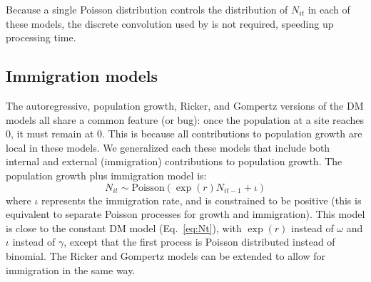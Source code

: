 \documentclass[12pt]{article}
\begin{document}
Because a single Poisson distribution controls the
distribution of $N_{it}$ in each of these models, the discrete
convolution used by \citet{dail_madsen:2011} is not required,
speeding up processing time.

\subsection{Immigration models}

The autoregressive, population growth, Ricker, and Gompertz
versions of the DM models all share a common feature (or bug):
once the population at a site reaches 0, it must remain at 0.
This is because all contributions to population growth are
local in these models.  We generalized each these models that
include both internal and external (immigration) contributions
to population growth.  The population growth plus immigration
model is:
\begin{equation}
  N_{it} \sim \text{Poisson}(\exp(r)N_{it-1} + \iota)
  \label{eq:expimm2}
\end{equation}
where $\iota$ represents the immigration rate, and is constrained to be 
positive (this is equivalent to separate Poisson processes for growth and 
immigration).  This model is close to
the constant DM model (Eq.~\ref{eq:Nt}), with $\exp(r)$ instead of $\omega$
and $\iota$ instead of $\gamma$, except that the first
process is Poisson distributed instead of binomial. The Ricker and
Gompertz models can be extended to allow for immigration in the same
way.

\end{document}
